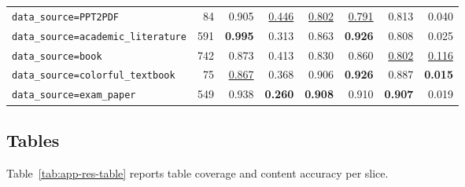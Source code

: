 \begin{table}[H]
{\begin{tabular}{@{}l r r r r r r r@{}}
    \midrule
    \texttt{data\_source=PPT2PDF} & 84 & 0.905 & \underline{0.446} & \underline{0.802} & \underline{0.791} & 0.813 & 0.040 \\
    \texttt{data\_source=academic\_literature} & 591 & \textbf{0.995} & 0.313 & 0.863 & \textbf{0.926} & 0.808 & 0.025 \\
    \texttt{data\_source=book} & 742 & 0.873 & 0.413 & 0.830 & 0.860 & \underline{0.802} & \underline{0.116} \\
    \texttt{data\_source=colorful\_textbook} & 75 & \underline{0.867} & 0.368 & 0.906 & \textbf{0.926} & 0.887 & \textbf{0.015} \\
    \texttt{data\_source=exam\_paper} & 549 & 0.938 & \textbf{0.260} & \textbf{0.908} & 0.910 & \textbf{0.907} & 0.019 \\
\bottomrule
\end{tabular}%
}
\end{table}

\subsection{Tables}

Table~\ref{tab:app-res-table} reports table coverage and content accuracy per
slice.

